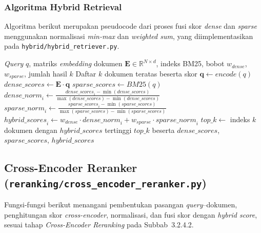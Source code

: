\subsubsection{Algoritma Hybrid Retrieval}

Algoritma berikut merupakan pseudocode dari proses fusi skor \textit{dense} dan \textit{sparse} menggunakan normalisasi \textit{min-max} dan \textit{weighted sum}, yang diimplementasikan pada \texttt{hybrid/hybrid\_retriever.py}.

\begin{algorithm}[H]
\caption{Hybrid Retrieval Score Fusion}
\label{alg:hybrid_retrieval}
\begin{algorithmic}[1]
\Require \textit{Query} $q$, matriks \textit{embedding} dokumen $\mathbf{E} \in \mathbb{R}^{N \times d}$, indeks BM25, bobot $w_{\textit{dense}}$, $w_{\textit{sparse}}$, jumlah hasil $k$
\Ensure Daftar $k$ dokumen teratas beserta skor
\State $\mathbf{q} \gets \mathit{encode}(q)$ 
\State $\mathit{dense\_scores} \gets \mathbf{E} \cdot \mathbf{q}$ 
\State $\mathit{sparse\_scores} \gets \mathit{BM25}(q)$ 
\State $\mathit{dense\_norm}_i \gets \frac{\mathit{dense\_scores}_i - \min(\mathit{dense\_scores})}{\max(\mathit{dense\_scores}) - \min(\mathit{dense\_scores})}$ 
\State $\mathit{sparse\_norm}_i \gets \frac{\mathit{sparse\_scores}_i - \min(\mathit{sparse\_scores})}{\max(\mathit{sparse\_scores}) - \min(\mathit{sparse\_scores})}$
    \State $\mathit{hybrid\_scores}_i \gets w_{\textit{dense}} \cdot \mathit{dense\_norm}_i + w_{\textit{sparse}} \cdot \mathit{sparse\_norm}_i$
\EndFor
\State $\mathit{top\_k} \gets$ indeks $k$ dokumen dengan $\mathit{hybrid\_scores}$ tertinggi
\State \Return $\mathit{top\_k}$ beserta $\mathit{dense\_scores}$, $\mathit{sparse\_scores}$, $\mathit{hybrid\_scores}$
\end{algorithmic}
\end{algorithm}

\subsection{Cross-Encoder Reranker (\texttt{reranking/cross\_encoder\_reranker.py})}

Fungsi-fungsi berikut menangani pembentukan pasangan \textit{query}--dokumen, penghitungan skor \textit{cross-encoder}, normalisasi, dan fusi skor dengan \textit{hybrid score}, sesuai tahap \textit{Cross-Encoder Reranking} pada Subbab~3.2.4.2.

